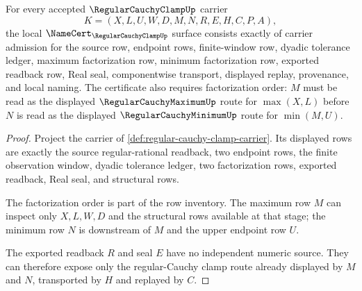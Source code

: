\begin{theorem}
\label{thm:regular-cauchy-clamp-namecert-obligations}
For every accepted $\RegularCauchyClampUp$ carrier
$$
K=(X,L,U,W,D,M,N,R,E,H,C,P,A),
$$
the local $\NameCert_{\RegularCauchyClampUp}$ surface consists exactly of carrier admission for the source row, endpoint rows, finite-window row, dyadic tolerance ledger, maximum factorization row, minimum factorization row, exported readback row, Real seal, componentwise transport, displayed replay, provenance, and local naming. The certificate also requires factorization order: $M$ must be read as the displayed $\RegularCauchyMaximumUp$ route for $\max(X,L)$ before $N$ is read as the displayed $\RegularCauchyMinimumUp$ route for $\min(M,U)$.
\end{theorem}
\begin{proof}
Project the carrier of \autoref{def:regular-cauchy-clamp-carrier}. Its displayed rows are exactly the source regular-rational readback, two endpoint rows, the finite observation window, dyadic tolerance ledger, two factorization rows, exported readback, Real seal, and structural rows.

The factorization order is part of the row inventory. The maximum row $M$ can inspect only $X,L,W,D$ and the structural rows available at that stage; the minimum row $N$ is downstream of $M$ and the upper endpoint row $U$.

The exported readback $R$ and seal $E$ have no independent numeric source. They can therefore expose only the regular-Cauchy clamp route already displayed by $M$ and $N$, transported by $H$ and replayed by $C$.
\end{proof}

